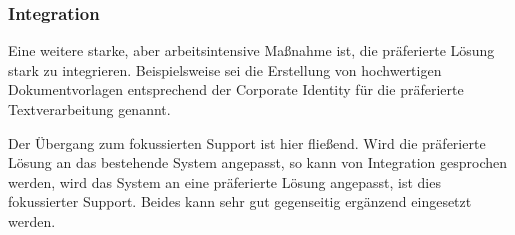 \subsubsection{Integration}
Eine weitere starke, aber arbeitsintensive Maßnahme ist, die präferierte Lösung stark zu integrieren. Beispielsweise sei die Erstellung von hochwertigen Dokumentvorlagen entsprechend der Corporate Identity für die präferierte Textverarbeitung genannt.

Der Übergang zum fokussierten Support ist hier fließend. Wird die präferierte Lösung an das bestehende System angepasst, so kann von Integration gesprochen werden, wird das System an eine präferierte Lösung angepasst, ist dies fokussierter Support. Beides kann sehr gut gegenseitig ergänzend eingesetzt werden.